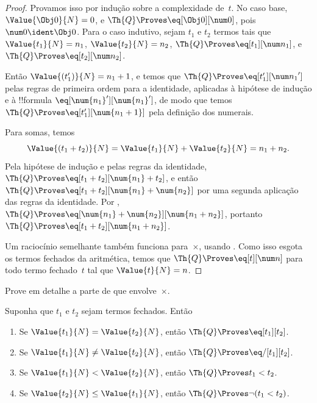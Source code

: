 \documentclass[../../../include/open-logic-section]{subfiles}
\begin{document}
\begin{proof}
Provamos isso por indução sobre a complexidade de~$t$. No caso base,
$\Value{\Obj 0}{N} = 0$, e $\Th{Q} \Proves \eq[\Obj 0][\num 0]$, pois
$\num 0 \ident \Obj 0$.
%
Para o caso indutivo, sejam $t_1$ e $t_2$ termos tais que
$\Value{t_1}{N} = n_1$, $\Value{t_2}{N} = n_2$,
$\Th{Q} \Proves \eq[t_1][\num n_1]$, e
$\Th{Q} \Proves \eq[t_2][\num n_2]$.

Então $\Value{(t_1')}{N} = n_1 + 1$, e temos que $\Th{Q} \Proves
\eq[t_1'][{\num n_1}']$ pelas regras de primeira ordem para a identidade,
aplicadas à hipótese de indução e à !!{formula}
$\eq[\num{n_1}'][\num{n_1}']$,
de modo que temos $\Th{Q} \Proves \eq[t_1'][\num{n_1 + 1}]$ pela
definição dos numerais.

Para somas, temos
\[
      \Value{(t_1 + t_2)}{N}
    = \Value{t_1}{N} + \Value{t_2}{N}
    = n_1 + n_2.
\]
Pela hipótese de indução e pelas regras da identidade,
$\Th{Q} \Proves \eq[t_1 + t_2][\num{n_1} + t_2]$, e então
$\Th{Q} \Proves \eq[t_1 + t_2][\num{n_1} + \num{n_2}]$
por uma segunda aplicação das regras da identidade. Por
,
$\Th{Q} \Proves \eq[\num{n_1} + \num{n_2}][\num{n_1 + n_2}]$,
portanto $\Th{Q} \Proves \eq[t_1 + t_2][\num{n_1 + n_2}]$.

Um raciocínio semelhante também funciona para~$\times$, usando
.
%
Como isso esgota os termos fechados da aritmética, temos que
$\Th{Q} \Proves \eq[t][\num n]$ para todo termo fechado~$t$ tal que
$\Value{t}{N} = n$.
\end{proof}

\begin{prob}
Prove em detalhe a parte de  que
envolve~$\times$.
\end{prob}

\begin{lem}
Suponha que $t_1$ e $t_2$ sejam termos fechados. Então
\begin{enumerate}
\item Se $\Value{t_1}{N} = \Value{t_2}{N}$, então
    $\Th{Q} \Proves \eq[t_1][t_2]$.
\item Se $\Value{t_1}{N} \neq \Value{t_2}{N}$, então
    $\Th{Q} \Proves \eq/[t_1][t_2]$.
\item Se $\Value{t_1}{N} < \Value{t_2}{N}$, então
    $\Th{Q} \Proves t_1 < t_2$.
\item Se $\Value{t_2}{N} \leq \Value{t_1}{N}$, então
    $\Th{Q} \Proves \lnot(t_1 < t_2)$.
\end{enumerate}
\end{lem}
\end{document}
